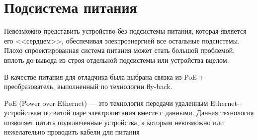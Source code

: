 \section{Подсистема питания}
\hspace{1cm} 

Невозможно представить устройство без подсистемы питания, которая является его <<сердцем>>,
обеспечивая электроэнергией все остальные подсистемы. Плохо спроектированная система питания
может стать большой проблемой, вплоть до вывода из строя отдельной подсистемы или устройства
вцелом.

В качестве питания для отладчика была выбрана связка из PoE + преобразователь, выполненный по 
технологии fly-back. 

PoE (Power over Ethernet) — это технология передачи удаленным Ethernet-устройствам по 
витой паре электропитания вместе с данными. Данная технология позволяет питать подключенные 
устройства, к которым невозможно или нежелательно проводить кабели для питания

